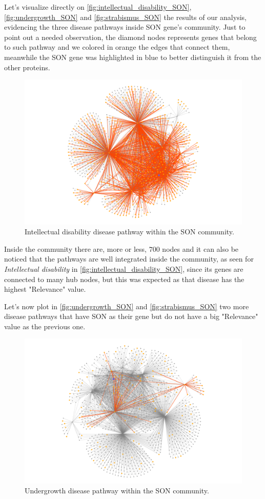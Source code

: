 Let's visualize directly on \autoref{fig:intellectual_disability_SON}, \autoref{fig:undergrowth_SON} and \autoref{fig:strabismus_SON} the results of our analysis, evidencing the three disease pathways inside SON gene's community. Just to point out a needed observation, the diamond nodes represents genes that belong to such pathway and we colored in orange the edges that connect them, meanwhile the SON gene was highlighted in blue to better distinguish it from the other proteins.
\begin{figure}[H]
    \centering
    \includegraphics[width=1\linewidth]{images/plots/intellectual_disability_SON.png}
    \caption{Intellectual disability disease pathway within the SON community.}
    \label{fig:intellectual_disability_SON}
\end{figure}
Inside the community there are, more or less, $700$ nodes and it can also be noticed that the pathways are well integrated inside the community, as seen for \textit{Intellectual disability} in \autoref{fig:intellectual_disability_SON}, since its genes are connected to many hub nodes, but this was expected as that disease has the highest "Relevance" value.
\vspace{3mm}

Let's now plot in \autoref{fig:undergrowth_SON} and \autoref{fig:strabismus_SON} two more disease pathways that have SON as their gene but do not have a big "Relevance" value as the previous one.
\begin{figure}[H]
    \centering
    \includegraphics[width=0.8\linewidth]{images/plots/undergrowth_SON.png}
    \caption{Undergrowth disease pathway within the SON community.}
    \label{fig:undergrowth_SON}
\end{figure}

